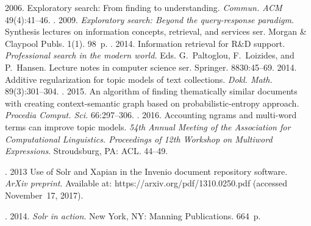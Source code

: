   \begin{multicols}{2}

\renewcommand{\bibname}{\protect\rmfamily References}

{\small\frenchspacing
 {%
 \begin{thebibliography}{99} 


 2006. Exploratory search: From finding to 
understanding. \textit{Commun. ACM} 49(4):41--46.
. 2009. \textit{Exploratory search: Beyond the 
query-response paradigm}. {Synthesis lectures on information concepts, 
retrieval, and services ser.} Morgan \& Claypool Publs. 1(1). 98~p.
. 2014. Information retrieval for R\&D support. 
\textit{Professional search in the modern world.}
Eds. G.~Paltoglou, F.~Loizides, and P.~Hansen. Lecture notes in computer 
science ser. Springer. 8830:45--69.
 2014. Additive regularization for topic models of text 
collections. \textit{Dokl. Math.} 89(3):301--304.
. 2015. An 
algorithm of finding thematically similar documents with creating  
context-semantic graph based on probabilistic-entropy approach. 
\textit{Procedia Comput. Sci.} 66:297--306.
. 2016. Accounting ngrams and 
multi-word terms can improve topic models. \textit{54th Annual Meeting of the 
Association for Computational Linguistics. Proceedings of 12th Workshop on 
Multiword Expressions}. Stroudsburg, PA: ACL. 44--49.

. 2013 
Use of Solr and Xapian in the Invenio document repository software. 
\textit{ArXiv preprint}. Available at: {\sf https://arxiv.org/pdf/1310.0250.pdf} 
(accessed November~17, 2017).

. 2014. \textit{Solr in action}. 
New York, NY: Manning Publications. 664~p.


\end{thebibliography}}}
\end{multicols}
